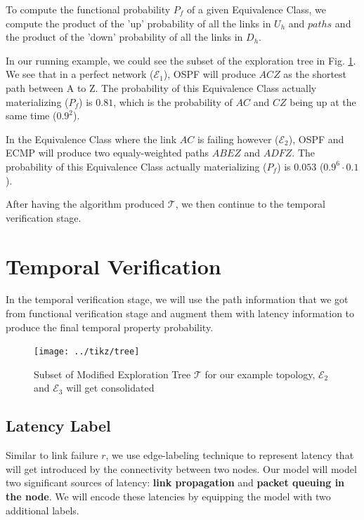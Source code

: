 \documentclass[10pt,sigconf,letterpaper,anonymous,nonacm]{acmart}
\begin{document}
To compute the functional probability $P_f$ of a given Equivalence Class, we compute the 
product of the 'up' probability of all the links in $U_h$ and $paths$ and the 
product of the 'down' probability of all the links in $D_h$.

In our running example, we could see the subset of the exploration tree in Fig. 
\ref{fig:tree}. 
We see that in a perfect network ($\mathcal{E}_1$), OSPF will produce $ACZ$ as the 
shortest path between A to Z.  
The probability of this Equivalence Class actually materializing ($P_f$) is $0.81$, 
which is the probability of $AC$ and $CZ$ being up at the same time ($0.9^2$).

In the Equivalence Class where the link $AC$ is failing however ($\mathcal{E}_2$), 
OSPF and ECMP will produce two equaly-weighted paths $ABEZ$ and $ADFZ$.
The probability of this Equivalence Class actually materializing ($P_f$) is $0.053$
($0.9^6 \cdot 0.1$).

After having the algorithm produced $\mathcal{T}$, we then continue to the temporal verification 
stage.

\section{Temporal Verification}
In the temporal verification stage, we will use the path information that we got from 
functional verification stage and augment them with latency information to 
produce the final temporal property probability.

\begin{figure}[h]
    \centering
    \texttt{[image: ../tikz/tree]}
    \caption{Subset of Modified Exploration Tree $\mathcal{T}$ for our example topology, 
        $\mathcal{E}_2$ and $\mathcal{E}_3$ will get consolidated}
    \label{fig:tree}
\end{figure}

\subsection{Latency Label}
Similar to link failure $r$, we use edge-labeling technique to represent latency that 
will get introduced by the connectivity between two nodes. 
Our model will model two significant sources of latency: \textbf{link propagation} 
and \textbf{packet queuing in the node}.
We will encode these latencies by equipping the model with two additional labels.
\end{document}
